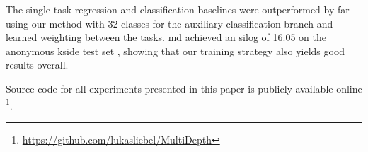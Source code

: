 \documentclass[lang=english]{tumarxivarticle}
\newcommand{\citep}{\parencite}
\begin{document}
The single-task regression and classification baselines were outperformed by far using our method with 32 classes for the auxiliary classification branch and learned weighting between the tasks.
\gls{md} achieved an \gls{silog} of \num{16.05} on the anonymous \gls{kside} test set \citep{Uhrig17,Geiger13}, showing that our training strategy also yields good results overall.

Source code for all experiments presented in this paper is publicly available online%
\footnote{\url{https://github.com/lukasliebel/MultiDepth}}.


\AtNextBibliography{\small}
\printbibliography
\end{document}
